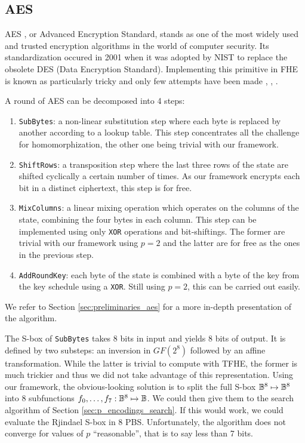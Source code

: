 \subsection{AES}
\label{sec:p_encodings_aes}


\gls{AES} \cite{aes-original}, or Advanced Encryption Standard, stands as one of the most widely used and trusted encryption algorithms in the world of computer security. Its standardization occured in 2001 when it was adopted by NIST to replace the obsolete DES (Data Encryption Standard). Implementing this primitive in \gls{FHE} is known as particularly tricky and only few attempts have been made \cite{C:GenHalSma12}, \cite{PKC:CorLepTib14}, \cite{DBLP:conf/wahc/TramaCBS23}.

A round of \gls{AES} can be decomposed into 4 steps:
\begin{enumerate}
    \item \texttt{SubBytes}: a non-linear substitution step where each byte is replaced by another according to a lookup table. This step concentrates all the challenge for homomorphization, the other one being trivial with our framework.
    \item \texttt{ShiftRows}: a transposition step where the last three rows of the state are shifted cyclically a certain number of times. As our framework encrypts each bit in a distinct ciphertext, this step is for free.
    \item \texttt{MixColumns}: a linear mixing operation which operates on the columns of the state, combining the four bytes in each column. This step can be implemented using only \texttt{XOR} operations and bit-shiftings. The former are trivial with our framework using $p=2$ and the latter are for free as the ones in the previous step.
    \item \texttt{AddRoundKey}: each byte of the state is combined with a byte of the key from the key schedule using a \texttt{XOR}. Still using $p=2$, this can be carried out easily. 
\end{enumerate}

We refer to Section \ref{sec:preliminaries_aes} for a more in-depth presentation of the algorithm. 


 The \gls{S-box} of \texttt{SubBytes} takes 8 bits in input and yields 8 bits of output. It is defined by two substeps: an inversion in $GF(2^8)$ followed by an affine transformation. While the latter is trivial to compute with \gls{TFHE}, the former is much trickier and thus we did not take advantage of this representation. Using our framework, the obvious-looking solution is to split the full \gls{S-box} $\mathbb{B}^8 \mapsto \mathbb{B}^8$ into 8 subfunctions $f_0, \dots, f_7: \mathbb{B}^8 \mapsto \mathbb{B}$. We could then give them to the search algorithm of Section \ref{sec:p_encodings_search}. If this would work, we could evaluate the Rjindael \gls{S-box} in 8 \gls{PBS}. Unfortunately, the algorithm does not converge for values of $p$ ``reasonable'', that is to say less than 7 bits. 


